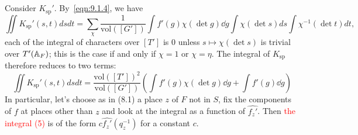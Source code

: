\subsection{}
Consider $K_{\mathrm{sp}}'$.
By~\eqref{eqn:9.1.4}, we have
\begin{equation}
    \iint K_{\mathrm{sp}}'(s, t)dsdt = \sum_{\chi} \frac{1}{\mathrm{vol}([G'])} \int f'(g) \chi(\det g) \dd g \int \chi(\det s) ds \int \chi^{-1}(\det t) dt,
\end{equation}
each of the integral of characters over $[T']$ is 0 unless $s\mapsto \chi(\det s)$ is trivial over $T'(\mathbb{A}_F) $; 
this is the case if and only if $\chi=1$ or $\chi=\eta$.
The integral of $K_{\mathrm{sp}}$ therefore reduces to two terms:
\begin{equation}
    \iint K_{\mathrm{sp}}'(s, t) dsdt = \frac{\mathrm{vol}([T'])^2}{\mathrm{vol}([G'])} \left(\int f'(g)\chi(\det g)\dd g + \int f'(g) \dd g\right)
\end{equation}
In particular, let's choose as in (8.1) a place $z$ of $F$ not in $S$, fix the components of $f$ at places other than $z$ and look at the integral as a function of $\hat{f_z'}$.
Then \textcolor{red}{the integral (5)} is of the form $c \hat{f_z'}(q_{z}^{-1})$ for a constant $c$.



